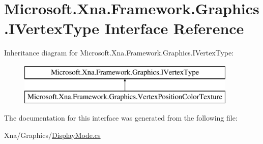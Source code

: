 \hypertarget{interface_microsoft_1_1_xna_1_1_framework_1_1_graphics_1_1_i_vertex_type}{}\section{Microsoft.\+Xna.\+Framework.\+Graphics.\+I\+Vertex\+Type Interface Reference}
\label{interface_microsoft_1_1_xna_1_1_framework_1_1_graphics_1_1_i_vertex_type}
Inheritance diagram for Microsoft.\+Xna.\+Framework.\+Graphics.\+I\+Vertex\+Type\+:\begin{figure}[H]
\begin{center}
\leavevmode
\includegraphics[height=2.000000cm]{interface_microsoft_1_1_xna_1_1_framework_1_1_graphics_1_1_i_vertex_type}
\end{center}
\end{figure}


The documentation for this interface was generated from the following file\+:\begin{DoxyCompactItemize}
\item 
Xna/\+Graphics/\hyperlink{_display_mode_8cs}{Display\+Mode.\+cs}\end{DoxyCompactItemize}

